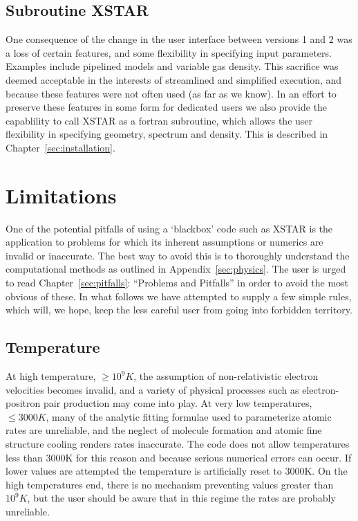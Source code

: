 \subsection{Subroutine XSTAR}

One consequence of the change in the user interface between versions 1 and 2 was a loss 
of certain features, and some flexibility in specifying input 
parameters.  Examples include pipelined models and variable gas 
density.  This sacrifice was deemed acceptable in the interests of streamlined 
and simplified execution, and because these features were not often 
used (as far as we know).  In an effort to preserve these 
features in some form for dedicated users we also provide the 
capablility to call XSTAR as a fortran subroutine, which allows 
the user flexibility in specifying geometry, spectrum and density.
This is described in Chapter~\ref{sec:installation}.

\section{Limitations}

One of the potential pitfalls of using a `blackbox' code such as XSTAR 
is the application to problems for which its inherent assumptions or
numerics are invalid or inaccurate.  The best way to avoid this is 
to thoroughly understand the computational methods as outlined 
in Appendix~\ref{sec:physics}.  The user is urged to read Chapter~\ref{sec:pitfalls}: 
``Problems and Pitfalls'' in order to avoid the most obvious of these.
In what follows we have attempted to supply 
a few simple rules, which will, we hope, keep the less careful 
user from going into forbidden territory. 

\subsection{Temperature}

At high temperature, $\geq 10^9 K$, the assumption of non-relativistic 
electron velocities becomes invalid, and a variety of physical processes 
such as electron-positron pair production may come into play.  At very 
low temperatures, $\leq 3000 K$, many of the analytic fitting formulae 
used to parameterize atomic rates are unreliable, and 
the neglect of molecule formation and atomic fine structure cooling renders
rates inaccurate.  The code does not allow temperatures less than 
3000K for this reason and because serious numerical errors can occur.
If lower values are attempted the temperature is artificially reset to 3000K.
On the high temperatures end, there is no mechanism preventing 
values greater than  $10^9 K$, but the user should be aware that in this 
regime the rates are probably unreliable.


